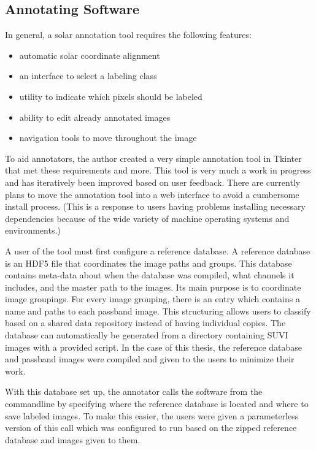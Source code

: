 \documentclass[twoside]{report}
\begin{document}
\subsection{Annotating Software}
In general, a solar annotation tool requires the following features:
\begin{itemize}
\item automatic solar coordinate alignment 
\item an interface to select a labeling class
\item utility to indicate which pixels should be labeled
\item ability to edit already annotated images
\item navigation tools to move throughout the image
\end{itemize}

To aid annotators, the author created a very simple annotation tool in Tkinter that met these requirements and more. This tool is very much a work in progress and has iteratively been improved based on user feedback. There are currently plans to move the annotation tool into a web interface to avoid a cumbersome install process. (This is a response to users having problems installing necessary dependencies because of the wide variety of machine operating systems and environments.) 

A user of the tool must first configure a reference database. A reference database is an HDF5 file that coordinates the image paths and groups. This database contains meta-data about when the database was compiled, what channels it includes, and the master path to the images. Its main purpose is to coordinate image groupings. For every image grouping, there is an entry which contains a name and paths to each passband image. This structuring allows users to classify based on a shared data repository instead of having individual copies. The database can automatically be generated from a directory containing SUVI images with a provided script. In the case of this thesis, the reference database and passband images were compiled and given to the users to minimize their work. 

With this database set up, the annotator calls the software from the commandline by specifying where the reference database is located and where to save labeled images. To make this easier, the users were given a parameterless version of this call which was configured to run based on the zipped reference database and images given to them. 
\end{document}
